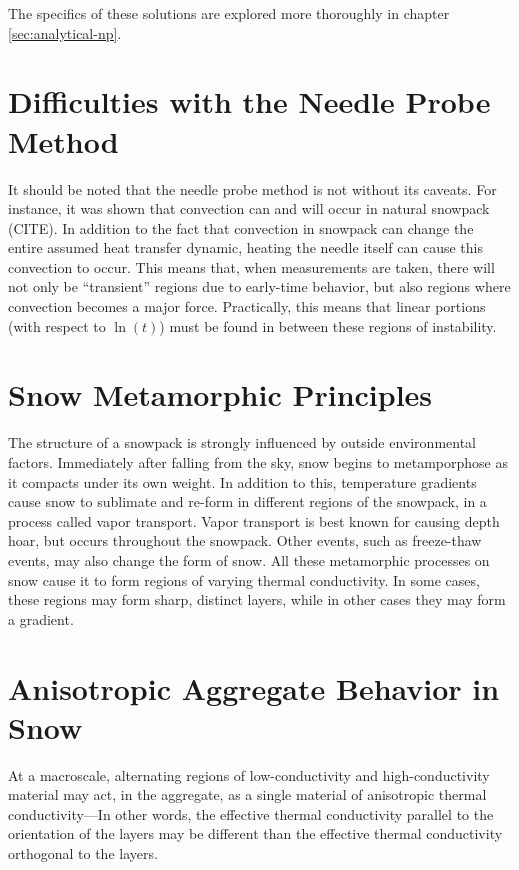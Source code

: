 The specifics of these solutions are explored more thoroughly in chapter
\ref{sec:analytical-np}.

\section{Difficulties with the Needle Probe Method}

It should be noted that the needle probe method is not without its caveats. For
instance, it was shown that convection can and will occur in natural snowpack
(CITE). In addition to the fact that convection in snowpack can change the
entire assumed heat transfer dynamic, heating the needle itself can cause this
convection to occur. This means that, when measurements are taken, there will
not only be ``transient'' regions due to early-time behavior, but also regions
where convection becomes a major force. Practically, this means that linear
portions (with respect to \(\ln(t)\)) must be found in between these regions
of instability.

\section{Snow Metamorphic Principles}
\label{sec:introduction:metamorphic}

The structure of a snowpack is strongly influenced by outside environmental
factors. Immediately after falling from the sky, snow begins to metamporphose as
it compacts under its own weight. In addition to this, temperature gradients
cause snow to sublimate and re-form in different regions of the snowpack, in a
process called vapor transport. Vapor transport is best known for causing
depth hoar, but occurs throughout the snowpack. Other events, such as
freeze-thaw events, may also change the form of snow. All these metamorphic
processes on snow cause it to form regions of varying thermal conductivity. In
some cases, these regions may form sharp, distinct layers, while in other cases
they may form a gradient.

\section{Anisotropic Aggregate Behavior in Snow}

At a macroscale, alternating regions of low-conductivity and high-conductivity
material may act, in the aggregate, as a single material of anisotropic thermal
conductivity---In other words, the effective thermal conductivity parallel to
the orientation of the layers may be different than the effective thermal
conductivity orthogonal to the layers.


